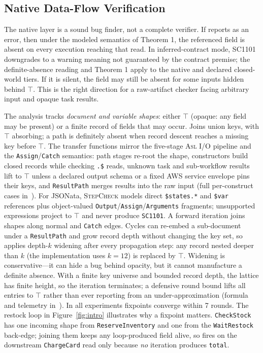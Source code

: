 \subsection{Native Data-Flow Verification}
\label{sec:approach:dataflow}

The native layer is a sound bug finder, not a complete verifier. If \tool{} reports  as an error,
then under the modeled semantics of Theorem 1,
the referenced field is absent on every execution reaching that read. In inferred-contract mode, SC1101 downgrades to a warning meaning not guaranteed by the contract premise; the definite-absence reading and Theorem 1 apply to the native and declared closed-world tiers. 
If it is silent, the field may
still be absent for some inputs hidden behind $\top$. This is the right direction for a raw-artifact
checker facing arbitrary input and opaque task results.

The analysis tracks \emph{document and variable shapes}: either $\top$ (opaque: any field may be
present) or a finite record of fields that may occur. Joins union keys, with $\top$ absorbing; a
path is definitely absent when record descent reaches a missing key before $\top$. 
The transfer functions mirror the five-stage \textsc{Asl} I/O pipeline
and the \texttt{Assign}/\texttt{Catch} semantics: path stages re-root
the shape, constructors build closed records while checking
\texttt{.\$} reads, unknown task and sub-workflow results lift to $\top$
unless a declared output schema or a fixed AWS service envelope pins
their keys, and \texttt{ResultPath} merges results into the raw input
(full per-construct cases in~\cite{stepcheck-repo}).
For JSONata, \textsc{StepCheck} models direct \texttt{\$states.*} and
\texttt{\$var} references plus object-valued
\texttt{Output}/\texttt{Assign}/\texttt{Arguments} fragments;
unsupported expressions project to $\top$ and never produce
\texttt{SC1101}.
A forward iteration joins shapes along normal and \texttt{Catch} edges. Cycles can re-embed a
sub-document under a \texttt{ResultPath} and grow record depth without changing the key set, so
\tool{} applies depth-$k$ widening after every propagation step: any record nested deeper than $k$
(the implementation uses $k=12$) is replaced by $\top$. Widening is conservative---it can hide a
bug behind opacity, but it cannot manufacture a definite absence. 
With a finite key universe and bounded record depth, the lattice has
finite height, so the iteration terminates; a defensive round bound
lifts all entries to $\top$ rather than ever reporting from an
under-approximation (formula and telemetry in~\cite{stepcheck-repo}). In all experiments fixpoints converge
within 7 rounds.
The restock loop in Figure~\ref{fig:intro} illustrates why a fixpoint matters. \texttt{CheckStock}
has one incoming shape from \texttt{ReserveInventory} and one from the \texttt{WaitRestock}
back-edge; joining them keeps any loop-produced field alive, so  fires on the
downstream \texttt{ChargeCard} read only because \emph{no} iteration produces \texttt{total}.

